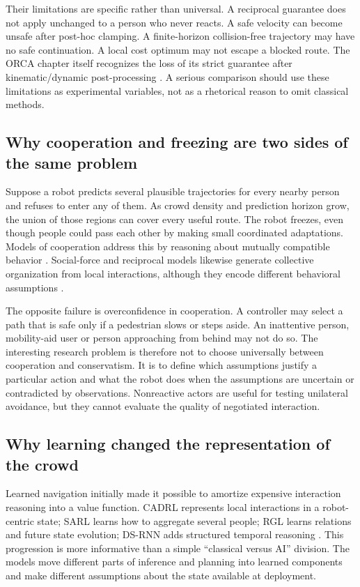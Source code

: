 Their limitations are specific rather than universal. A reciprocal guarantee
does not apply unchanged to a person who never reacts. A safe velocity can become
unsafe after post-hoc clamping. A finite-horizon collision-free trajectory may
have no safe continuation. A local cost optimum may not escape a blocked route.
The ORCA chapter itself recognizes the loss of its strict guarantee after
kinematic/dynamic post-processing \citep{orca}. A serious comparison should use
these limitations as experimental variables, not as a rhetorical reason to omit
classical methods.

\subsection{Why cooperation and freezing are two sides of the same problem}
Suppose a robot predicts several plausible trajectories for every nearby person
and refuses to enter any of them. As crowd density and prediction horizon grow,
the union of those regions can cover every useful route. The robot freezes, even
though people could pass each other by making small coordinated adaptations.
Models of cooperation address this by reasoning about mutually compatible
behavior \citep{freezing}. Social-force and reciprocal models likewise generate
collective organization from local interactions, although they encode different
behavioral assumptions \citep{socialforce,orca}.

The opposite failure is overconfidence in cooperation. A controller may select
a path that is safe only if a pedestrian slows or steps aside. An inattentive
person, mobility-aid user or person approaching from behind may not do so. The
interesting research problem is therefore not to choose universally between
cooperation and conservatism. It is to define which assumptions justify a
particular action and what the robot does when the assumptions are uncertain or
contradicted by observations. Nonreactive actors are useful for testing unilateral
avoidance, but they cannot evaluate the quality of negotiated interaction.

\subsection{Why learning changed the representation of the crowd}
Learned navigation initially made it possible to amortize expensive interaction
reasoning into a value function. CADRL represents local interactions in a
robot-centric state; SARL learns how to aggregate several people; RGL learns
relations and future state evolution; DS-RNN adds structured temporal reasoning
\citep{cadrl,sarl,rgl,dsrnn}. This progression is more informative than a simple
``classical versus AI'' division. The models move different parts of inference
and planning into learned components and make different assumptions about the
state available at deployment.

